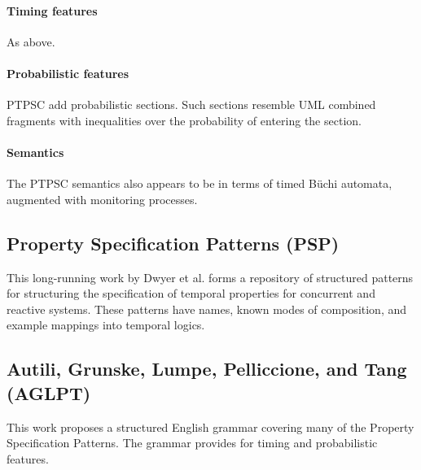 \paragraph{Timing features}
As above.

\paragraph{Probabilistic features}
PTPSC add probabilistic
sections.  Such sections resemble UML combined fragments with inequalities over
the probability of entering the section.

\paragraph{Semantics}
The PTPSC semantics also appears to be in terms of timed B\"uchi automata,
augmented with monitoring processes.  

\subsection{Property Specification Patterns (PSP)}

This long-running work by Dwyer et al. forms a repository of
structured patterns for structuring the specification of temporal
properties for concurrent and reactive systems.  These patterns have names,
known modes of composition, and example mappings into temporal logics.

\subsection{Autili, Grunske, Lumpe, Pelliccione, and Tang (AGLPT)}

This work proposes a structured English grammar covering many of the Property
Specification Patterns.  The grammar provides for timing and probabilistic
features.


